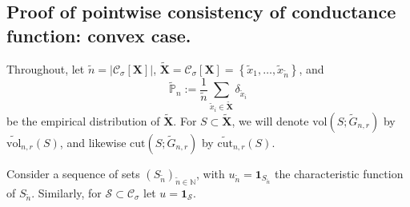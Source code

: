 \documentclass{article}
\newcommand{\set}[1]{\left\{#1\right\}}
\newcommand{\vol}{\mathrm{vol}}
\newcommand{\abs}[1]{\left \lvert #1 \right \rvert}
\newcommand{\1}{\mathbf{1}}
\newcommand{\cut}{\mathrm{cut}}
\newcommand{\Xbf}{\mathbf{X}}
\newcommand{\Pbb}{\mathbb{P}}
\newcommand{\Sset}{\mathcal{S}}
\newcommand{\Cset}{\mathcal{C}}
\newcommand{\Csig}{\Cset_{\sigma}}
\newcommand{\wn}{\widetilde{n}}
\newcommand{\wX}{\widetilde{\Xbf}}
\newcommand{\wx}{\widetilde{x}}
\theoremstyle{aldenthm}
\begin{document}
\subsection{Proof of pointwise consistency of conductance function: convex case.}
\label{subsection: proof_of_pointwise consitency_of_conductance_function}

Throughout, let $\wn = \abs{\Csig[\Xbf]}$, $\wX = \Csig[\Xbf] = \set{\wx_1, \ldots, \wx_{\wn}}$, and 
\begin{equation*}
\widetilde{\Pbb}_n := \frac{1}{\wn} \sum_{\wx_i \in \wX} \delta_{\wx_i}
\end{equation*}
be the empirical distribution of $\wX$. For $S \subset \wX$, we will denote $\vol(S; \widetilde{G}_{n,r})$ by $\widetilde{\vol}_{n,r}(S)$, and likewise $\cut(S; \widetilde{G}_{n,r})$ by $\widetilde{\cut}_{n,r}(S)$.

Consider a sequence of sets $(S_{\wn})_{\wn \in \mathbb{N}}$, with $u_{\wn} = \1_{S_{\wn}}$ the characteristic function of $S_{\wn}$. Similarly, for $\Sset \subset \Csig$ let $u = \1_{\Sset}$. 
\end{document}
